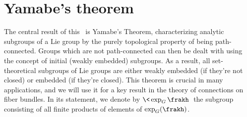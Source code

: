 



\section{Yamabe's theorem}\label{sec: Yamabe's theorem}

The central result of this \sect\ is Yamabe's Theorem, characterizing analytic subgroups of a Lie group by the purely topological property of being path-connected. Groups which are not path-connected can then be dealt with using the concept of initial (weakly embedded) subgroups. As a result, all set-theoretical subgroups of Lie groups are either weakly embedded (if they're not closed) or embedded (if they're closed). This theorem is crucial in many applications, and we will use it for a key result in the theory of connections on fiber bundles. In its statement, we denote by $\<\exp_G \frakh\>$ the subgroup consisting of all finite products of elements of $\exp_G(\frakh)$.


